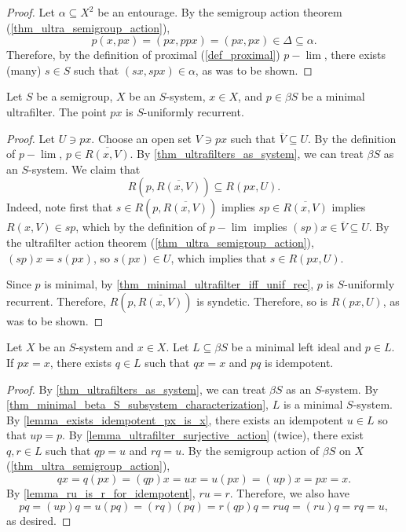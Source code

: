 \begin{proof}
    \leanok{}
    Let $\alpha \subseteq X^2$ be an entourage.  By the semigroup action theorem (\cref{thm_ultra_semigroup_action}), 
    \[p(x,px) = (px,ppx) = (px,px) \in \Delta \subseteq \alpha.\]
    Therefore, by the definition of proximal (\cref{def_proximal}) $p-\lim$, there exists (many) $s \in S$ such that $(sx,spx) \in \alpha$, as was to be shown.
\end{proof}

\begin{lemma}
    \label{lemma_minimal_implies_uniformly_recurrent}
    \leanok{}
    Let $S$ be a semigroup, $X$ be an $S$-system, $x \in X$, and $p \in \beta S$ be a minimal ultrafilter.  The point $px$ is $S$-uniformly recurrent.
\end{lemma}

\begin{proof}
\leanok{}
    Let $U \ni px$.  Choose an open set $V \ni px$ such that $\overline{V} \subseteq U$.  By the definition of $p-\lim$, $p \in \overline{R(x,V)}$.  By \cref{thm_ultrafilters_as_system}, we can treat $\beta S$ as an $S$-system. We claim that
    \[R(p,\overline{R(x,V)}) \subseteq R(px,U).\]
    Indeed, note first that $s \in R(p,\overline{R(x,V)})$ implies $sp \in \overline{R(x,V)}$ implies $R(x,V) \in sp$, which by the definition of $p-\lim$ implies $(sp)x \in \overline{V} \subseteq U$.  By the ultrafilter action theorem (\cref{thm_ultra_semigroup_action}), $(sp)x = s (px)$, so $s(px) \in U$, which implies that $s \in R(px,U)$.

    Since $p$ is minimal, by \cref{thm_minimal_ultrafilter_iff_unif_rec}, $p$ is $S$-uniformly recurrent.  Therefore, $R(p,\overline{R(x,V)})$ is syndetic. Therefore, so is $R(px,U)$, as was to be shown.
\end{proof}

\begin{lemma}
\label{lemma_ultrafilter_idempotent_lift}
\leanok{}
    Let $X$ be an $S$-system and $x \in X$.  Let $L \subseteq \beta S$ be a minimal left ideal and $p \in L$.  If $p x = x$, there exists $q \in L$ such that $q x = x$ and $pq$ is idempotent.
\end{lemma}

\begin{proof}
\leanok{}
    By \cref{thm_ultrafilters_as_system}, we can treat $\beta S$ as an $S$-system. By \cref{thm_minimal_beta_S_subsystem_characterization}, $L$ is a minimal $S$-system. By \cref{lemma_exists_idempotent_px_is_x}, there exists an idempotent $u \in L$ so that $up = p$.  By \cref{lemma_ultrafilter_surjective_action} (twice), there exist $q, r \in L$ such that $qp = u$ and $rq = u$. By the semigroup action of $\beta S$ on $X$ (\cref{thm_ultra_semigroup_action}),
    \[qx = q (p x) = (qp) x = ux = u (px) = (up) x = px = x.\]
    By \cref{lemma_ru_is_r_for_idempotent}, $ru = r$.  Therefore, we also have
    \[pq = (up)q = u (pq) = (rq) (pq) = r (qp) q = ruq = (ru) q = rq = u,\]
    as desired.
\end{proof}

